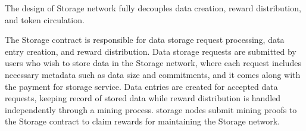 The design of \projabbrev Storage network fully decouples data creation, reward distribution, and token circulation.

The \projabbrev Storage contract is responsible for data storage request processing, data entry creation, and reward distribution. 
Data storage requests are submitted by users who wish to store data in the \projabbrev Storage network,
where each request includes necessary metadata such as data size and commitments,
and it comes along with the payment for storage service.
Data entries are created for accepted data requests, keeping record of stored data while
reward distribution is handled independently through a mining process.
storage nodes submit mining proofs to the \projabbrev Storage contract to claim rewards for maintaining the \projabbrev Storage network.


% 





